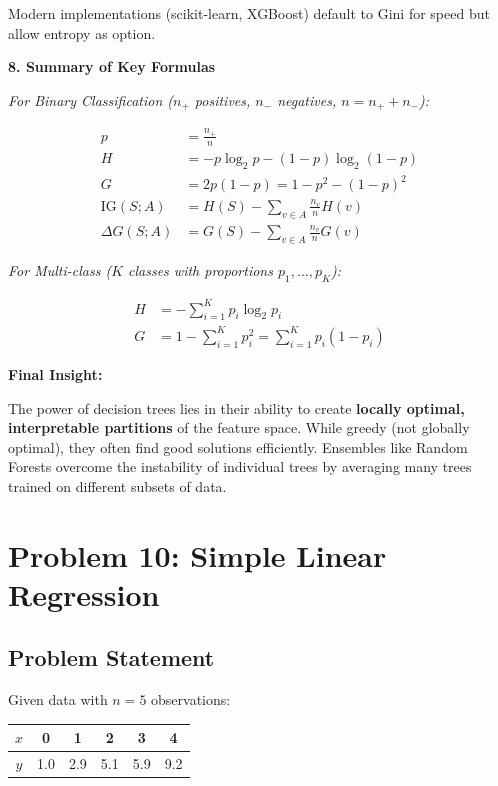 \documentclass[12pt]{article}
\begin{document}
\begin{explanation}
Modern implementations (scikit-learn, XGBoost) default to Gini for speed but allow entropy as option.

\textbf{8. Summary of Key Formulas}

\textit{For Binary Classification ($n_+$ positives, $n_-$ negatives, $n = n_+ + n_-$):}

\begin{align*}
p &= \frac{n_+}{n} \\[0.5em]
H &= -p \log_2 p - (1-p) \log_2(1-p) \\[0.5em]
G &= 2p(1-p) = 1 - p^2 - (1-p)^2 \\[0.5em]
\text{IG}(S; A) &= H(S) - \sum_{v \in A} \frac{n_v}{n} H(v) \\[0.5em]
\Delta G(S; A) &= G(S) - \sum_{v \in A} \frac{n_v}{n} G(v)
\end{align*}

\textit{For Multi-class ($K$ classes with proportions $p_1, \ldots, p_K$):}

\begin{align*}
H &= -\sum_{i=1}^K p_i \log_2 p_i \\[0.5em]
G &= 1 - \sum_{i=1}^K p_i^2 = \sum_{i=1}^K p_i(1 - p_i)
\end{align*}

\textbf{Final Insight:}

The power of decision trees lies in their ability to create \textbf{locally optimal, interpretable partitions} of the feature space. While greedy (not globally optimal), they often find good solutions efficiently. Ensembles like Random Forests overcome the instability of individual trees by averaging many trees trained on different subsets of data.
\end{explanation}

\section{Problem 10: Simple Linear Regression}

\subsection{Problem Statement}

Given data with $n = 5$ observations:

\begin{center}
\begin{tabular}{c|c|c|c|c|c}
$x$ & 0 & 1 & 2 & 3 & 4 \\
\hline
$y$ & 1.0 & 2.9 & 5.1 & 5.9 & 9.2 \\
\end{tabular}
\end{center}
\end{document}
